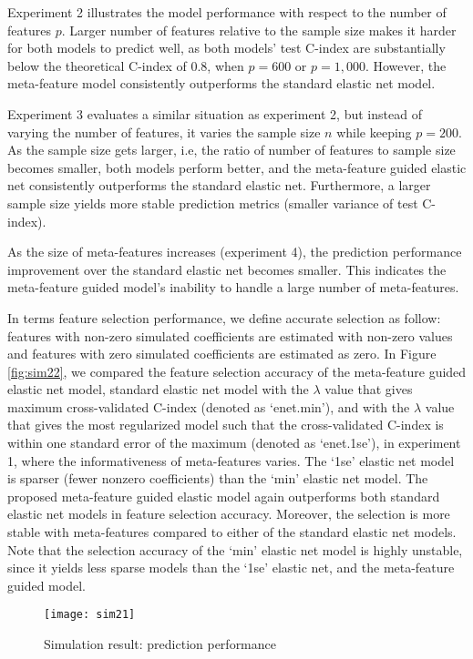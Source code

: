Experiment 2 illustrates the model performance with respect to the number of features $p$. Larger number of features relative to the sample size makes it harder for both models to predict well, as both models' test C-index are substantially below the theoretical C-index of 0.8, when $p=600$ or $p=1,000$. However, the meta-feature model consistently outperforms the standard elastic net model.

Experiment 3 evaluates a similar situation as experiment 2, but instead of varying the number of features, it varies the sample size $n$ while keeping $p=200$. As the sample size gets larger, i.e, the ratio of number of features to sample size  becomes smaller, both models perform better, and the meta-feature guided elastic net consistently outperforms the standard elastic net. Furthermore, a larger sample size yields more stable prediction metrics (smaller variance of test C-index). 

As the size of meta-features increases (experiment 4), the prediction performance improvement over the standard elastic net becomes smaller. This indicates the meta-feature guided model's inability to handle a large number of meta-features.  

In terms feature selection performance, we define accurate selection as follow: features with non-zero simulated coefficients are estimated with non-zero values and features with zero simulated coefficients are estimated as zero. In Figure \ref{fig:sim22}, we compared the feature selection accuracy of the meta-feature guided elastic net model, standard elastic net model with the $\lambda$ value that gives maximum cross-validated C-index (denoted as `enet.min'), and with the $\lambda$ value that gives the most regularized model such that the cross-validated C-index is within one standard error of the maximum (denoted as `enet.1se'), in experiment 1, where the informativeness of meta-features varies. The `1se' elastic net model is sparser (fewer nonzero coefficients) than the `min' elastic net model. The proposed meta-feature guided elastic model again outperforms both standard elastic net models in feature selection accuracy. Moreover, the selection is more stable with meta-features compared to either of the standard elastic net models. Note that the selection accuracy of the `min' elastic net model is highly unstable, since it yields less sparse models than the `1se' elastic net, and the meta-feature guided model.
\begin{figure}
    \texttt{[image: sim21]}
    \caption[Simulation results (meta guided): prediction performance] {Simulation result: prediction performance}
    \label{fig:sim21}
\end{figure} 

